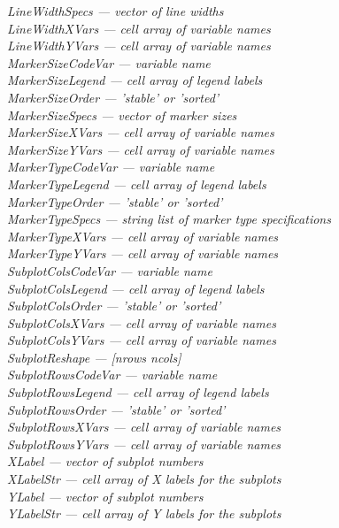 \documentclass{article}
\newcommand{\namevalue}[2]{{\it #1 --- #2}}
\begin{document}
\namevalue{LineWidthSpecs}{vector of line widths} \\
\namevalue{LineWidthXVars}{cell array of variable names} \\
\namevalue{LineWidthYVars}{cell array of variable names} \\
\namevalue{MarkerSizeCodeVar}{variable name} \\
\namevalue{MarkerSizeLegend}{cell array of legend labels} \\
\namevalue{MarkerSizeOrder}{'stable' or 'sorted'} \\
\namevalue{MarkerSizeSpecs}{vector of marker sizes} \\
\namevalue{MarkerSizeXVars}{cell array of variable names} \\
\namevalue{MarkerSizeYVars}{cell array of variable names} \\
\namevalue{MarkerTypeCodeVar}{variable name} \\
\namevalue{MarkerTypeLegend}{cell array of legend labels} \\
\namevalue{MarkerTypeOrder}{'stable' or 'sorted'} \\
\namevalue{MarkerTypeSpecs}{string list of marker type specifications} \\
\namevalue{MarkerTypeXVars}{cell array of variable names} \\
\namevalue{MarkerTypeYVars}{cell array of variable names} \\
\namevalue{SubplotColsCodeVar}{variable name} \\
\namevalue{SubplotColsLegend}{cell array of legend labels} \\
\namevalue{SubplotColsOrder}{'stable' or 'sorted'} \\
\namevalue{SubplotColsXVars}{cell array of variable names} \\
\namevalue{SubplotColsYVars}{cell array of variable names} \\
\namevalue{SubplotReshape}{[nrows ncols]} \\
\namevalue{SubplotRowsCodeVar}{variable name} \\
\namevalue{SubplotRowsLegend}{cell array of legend labels} \\
\namevalue{SubplotRowsOrder}{'stable' or 'sorted'} \\
\namevalue{SubplotRowsXVars}{cell array of variable names} \\
\namevalue{SubplotRowsYVars}{cell array of variable names} \\
\namevalue{XLabel}{vector of subplot numbers} \\
\namevalue{XLabelStr}{cell array of X labels for the subplots} \\
\namevalue{YLabel}{vector of subplot numbers} \\
\namevalue{YLabelStr}{cell array of Y labels for the subplots} \\
\end{document}

